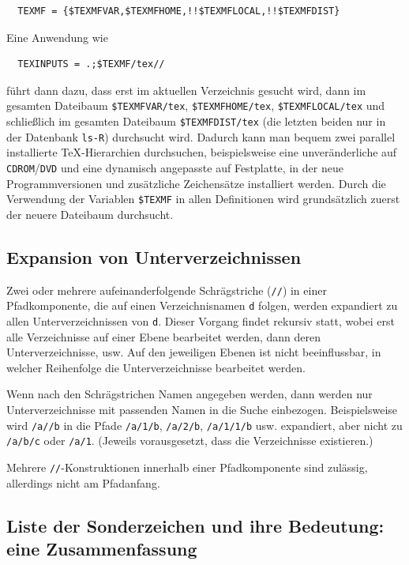 \documentclass[12pt,ngerman,a4paper,fullparskip]{scrreprt}
\newcommand{\acro}[1]{\texttt{#1}}
\newcommand{\code}[1]{\texttt{#1}}
\newcommand{\file}[1]{\texttt{#1}}
\newcommand{\dirname}[1]{\texttt{#1}}
\newcommand{\var}[1]{\texttt{#1}}
\providecommand*{\DVD}{\acro{DVD}\xspace}
\begin{document}
\begin{verbatim}
  TEXMF = {$TEXMFVAR,$TEXMFHOME,!!$TEXMFLOCAL,!!$TEXMFDIST}
\end{verbatim}

Eine Anwendung wie

\begin{verbatim}
  TEXINPUTS = .;$TEXMF/tex//
\end{verbatim}

führt dann dazu, dass erst im aktuellen Verzeichnis gesucht wird, dann
im gesamten Dateibaum \code{\$TEXMFVAR/tex}, \code{\$TEXMFHOME/tex}, \code{\$TEXMFLOCAL/tex} und schließlich im gesamten Dateibaum \dirname{\$TEXMFDIST/tex} (die letzten beiden nur in der Datenbank \file{ls-R}) durchsucht wird. Dadurch kann man bequem zwei parallel installierte \TeX-Hierarchien durchsuchen, beispielsweise eine unveränderliche auf \acro{CDROM}/{\DVD} und eine dynamisch angepasste auf Festplatte, in der neue Programmversionen und zusätzliche Zeichensätze installiert werden. Durch die Verwendung der Variablen \code{\$TEXMF} in allen Definitionen wird grundsätzlich zuerst der neuere Dateibaum durchsucht.


\subsection{Expansion von Unterverzeichnissen}\label{sec:subdirectory-expansion}

Zwei oder mehrere aufeinanderfolgende Schrägstriche (\texttt{//}) in einer Pfadkomponente, die auf einen Verzeichnisnamen \var{d} folgen, werden expandiert zu allen Unterverzeichnissen von \var{d}. Dieser Vorgang findet rekursiv statt, wobei erst alle Verzeichnisse auf einer Ebene bearbeitet werden, dann deren Unterverzeichnisse, usw. Auf den jeweiligen Ebenen ist nicht beeinflussbar, in welcher Reihenfolge die Unterverzeichnisse bearbeitet werden.

Wenn nach den Schrägstrichen Namen angegeben werden, dann werden nur
Unterverzeichnisse mit passenden Namen in die Suche einbezogen. Beispielsweise wird \code{/a//b} in die Pfade \file{/a/1/b}, \file{/a/2/b}, \file{/a/1/1/b} usw. expandiert, aber nicht zu \file{/a/b/c} oder \file{/a/1}. (Jeweils vorausgesetzt, dass die Verzeichnisse existieren.)

Mehrere \code{//}-Konstruktionen innerhalb einer Pfadkomponente
sind zulässig, allerdings nicht am Pfadanfang.


\subsection{Liste der Sonderzeichen und ihre Bedeutung: eine Zusammenfassung}
\end{document}
